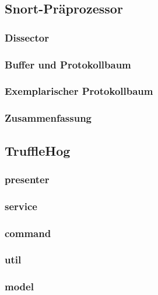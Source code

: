 \documentclass[18pt]{beamer}
\begin{document}
\subsection{Snort-Präprozessor}
	\subsubsection{Dissector}
		
		
		
		
		
		
		
	\subsubsection{Buffer und Protokollbaum}
		
	\subsubsection{Exemplarischer Protokollbaum}
		
	\subsubsection{Zusammenfassung}
		

\subsection{TruffleHog}
	
	\subsubsection{presenter}
		
	\subsubsection{service}
		
	\subsubsection{command}
		
	\subsubsection{util}
		
	\subsubsection{model}
		
\end{document}
